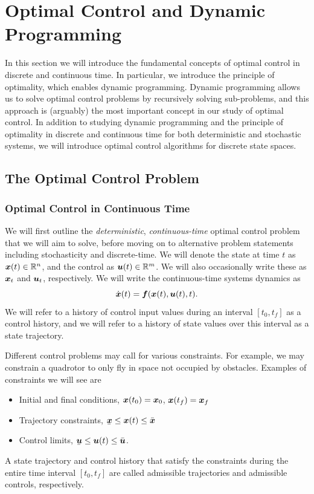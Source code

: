 \chapter{Optimal Control and Dynamic Programming}


In this section we will introduce the fundamental concepts of optimal control in discrete and continuous time. In particular, we introduce the principle of optimality, which enables dynamic programming. Dynamic programming allows us to solve optimal control problems by recursively solving sub-problems, and this approach is (arguably) the most important concept in our study of optimal control. In addition to studying dynamic programming and the principle of optimality in discrete and continuous time for both deterministic and stochastic systems, we will introduce optimal control algorithms for discrete state spaces.

\section{The Optimal Control Problem}

\subsection{Optimal Control in Continuous Time}

We will first outline the \textit{deterministic}, \textit{continuous-time} optimal control problem that we will aim to solve, before moving on to alternative problem statements including stochasticity and discrete-time. We will denote the state at time $t$ as $\bm{x}(t) \in \mathbb{R}^n$, and the control as $\bm{u}(t) \in \mathbb{R}^m$. We will also occasionally write these as $\bm{x}_t$ and $\bm{u}_t$, respectively. We will write the continuous-time systems dynamics as 
\begin{equation}
    \dot{\bm{x}}(t) = \bm{f}(\bm{x}(t),\bm{u}(t),t).
    \label{eq:2_ct_dyn}
\end{equation}
We will refer to a history of control input values during an interval $[t_0,t_f]$ as a control history, and we will refer to a history of state values over this interval as a state trajectory. 

Different control problems may call for various constraints. For example, we may constrain a quadrotor to only fly in space not occupied by obstacles. Examples of constraints we will see are
\begin{itemize}
    \item Initial and final conditions, $\bm{x}(t_0) = \bm{x}_0$, $\bm{x}(t_f) = \bm{x}_f$
    \item Trajectory constraints, $\munderbar{\st} \leq \st(t) \leq \bar{\st}$
    \item Control limits, $\munderbar{\ac} \leq \ac(t) \leq \bar{\ac}$.
\end{itemize}
A state trajectory and control history that satisfy the constraints during the entire time interval $[t_0,t_f]$ are called admissible trajectories and admissible controls, respectively. 

